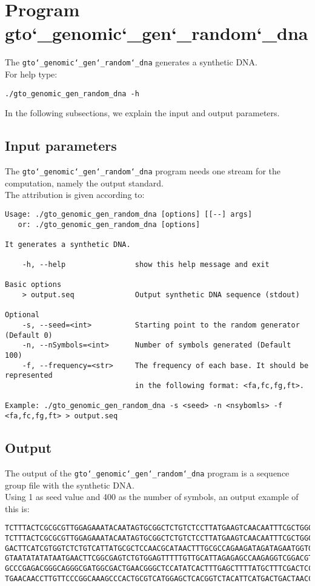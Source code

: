 \section{Program gto\char`_genomic\char`_gen\char`_random\char`_dna}
The \texttt{gto\char`_genomic\char`_gen\char`_random\char`_dna} generates a synthetic DNA.\\
For help type:
\begin{lstlisting}
./gto_genomic_gen_random_dna -h
\end{lstlisting}
In the following subsections, we explain the input and output parameters.

\subsection*{Input parameters}

The \texttt{gto\char`_genomic\char`_gen\char`_random\char`_dna} program needs one stream for the computation, namely the output standard.\\
The attribution is given according to:
\begin{lstlisting}
Usage: ./gto_genomic_gen_random_dna [options] [[--] args]
   or: ./gto_genomic_gen_random_dna [options]

It generates a synthetic DNA.

    -h, --help                show this help message and exit

Basic options
    > output.seq              Output synthetic DNA sequence (stdout)

Optional
    -s, --seed=<int>          Starting point to the random generator (Default 0)
    -n, --nSymbols=<int>      Number of symbols generated (Default 100)
    -f, --frequency=<str>     The frequency of each base. It should be represented 
    						  in the following format: <fa,fc,fg,ft>.

Example: ./gto_genomic_gen_random_dna -s <seed> -n <nsybomls> -f <fa,fc,fg,ft> > output.seq
\end{lstlisting}

\subsection*{Output}
The output of the \texttt{gto\char`_genomic\char`_gen\char`_random\char`_dna} program is a sequence group file with the synthetic DNA.\\
Using 1 as seed value and 400 as the number of symbols, an output example of this is:
\begin{lstlisting}
TCTTTACTCGCGCGTTGGAGAAATACAATAGTGCGGCTCTGTCTCCTTATGAAGTCAACAATTTCGCTGGGACTTGCGGC
TCTTTACTCGCGCGTTGGAGAAATACAATAGTGCGGCTCTGTCTCCTTATGAAGTCAACAATTTCGCTGGGACTTGCGGC
GACTTCATCGTGGTCTCTGTCATTATGCGCTCCAACGCATAACTTTGCGCCAGAAGATAGATAGAATGGTGTAAGAAACT
GTAATATATATAATGAACTTCGGCGAGTCTGTGGAGTTTTTGTTGCATTAGAGAGCCAAGAGGTCGGACGTCCTCACGTA
GCCCGAGACGGGCAGGGCGATGGCGACTGAACGGGCTCCATATCACTTTGAGCTTTTATGCTTTCGACTCCTCCAGGAGC
TGAACAACCTTGTTCCCGGCAAAGCCCACTGCGTCATGGAGCTCACGGTCTACATTCATGACTGACTAACCGTAAACTGC
\end{lstlisting}

